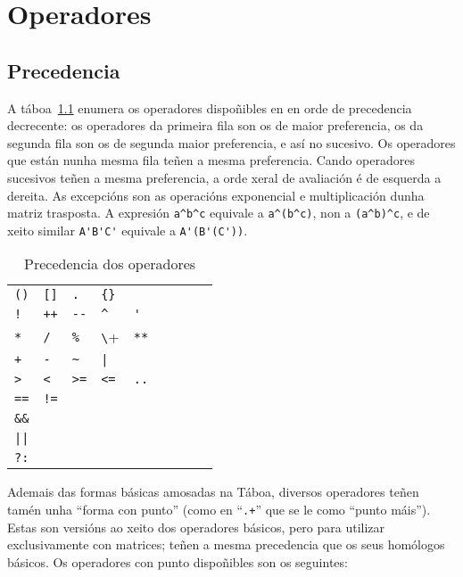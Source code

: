\chapter{Operadores}
\label{chap:operators}

\section{Precedencia}

A táboa~\ref{tab:ops} enumera os operadores dispoñibles en  en
orde de precedencia decrecente: os operadores da primeira fila son os de
maior preferencia, os da segunda fila son os de segunda maior preferencia,
e así no sucesivo. Os operadores que están nunha mesma fila teñen a mesma
preferencia. Cando operadores sucesivos teñen a mesma preferencia, a orde
xeral de avaliación é de esquerda a dereita. As excepcións son as operacións
exponencial e multiplicación dunha matriz trasposta. A expresión
\verb|a^b^c| equivale a \verb|a^(b^c)|, non a \verb|(a^b)^c|, e de xeito
similar \verb|A'B'C'| equivale a \verb|A'(B'(C'))|.

\begin{table}[htbp]
\caption{Precedencia dos operadores}
\label{tab:ops}
\begin{center}
\begin{tabular}{lllllllll}
\verb|()| & \verb|[]| & \texttt{.} & \verb|{}| \\
\texttt{!} & \texttt{++} & \verb|--| & \verb|^| & \verb|'| \\
\texttt{*} & \texttt{/} & \texttt{\%} & \verb+\+ & \texttt{**} \\
\texttt{+} & \texttt{-} & \verb|~| & \verb+|+ & \\
\verb|>| & \verb|<| & \verb|>=| & \verb|<=| & \texttt{..} \\
\texttt{==} & \texttt{!=} \\
\verb|&&| \\
\verb+||+ \\
\texttt{?:} \\
\end{tabular}
\end{center}
\end{table}

Ademais das formas básicas amosadas na Táboa, diversos operadores teñen
tamén unha ``forma con punto'' (como en ``\texttt{.+}'' que se le como
``punto máis''). Estas son versións ao xeito dos operadores básicos, pero
para utilizar exclusivamente con matrices; teñen a mesma precedencia que
os seus homólogos básicos. Os operadores con punto dispoñibles son os seguintes:

